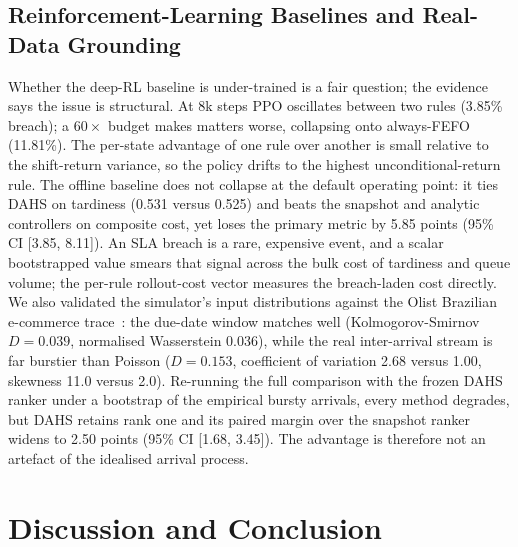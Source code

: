 \documentclass[conference]{IEEEtran}
\begin{document}
\subsection{Reinforcement-Learning Baselines and Real-Data Grounding}
\label{sec:rl}

Whether the deep-RL baseline is under-trained is a fair question; the evidence says
the issue is structural. At 8k steps PPO oscillates between two rules (3.85\%
breach); a $60\times$ budget makes matters worse, collapsing onto always-FEFO
(11.81\%). The per-state advantage of one rule over another is small relative to
the shift-return variance, so the policy drifts to the highest unconditional-return
rule. The offline baseline does not collapse at the default operating point: it
ties DAHS on tardiness (0.531 versus 0.525) and beats the snapshot and analytic
controllers on composite cost, yet loses the primary metric by 5.85 points
(95\% CI [3.85, 8.11]). An SLA breach is a rare, expensive event, and a scalar
bootstrapped value smears that signal across the bulk cost of tardiness and queue
volume; the per-rule rollout-cost vector measures the breach-laden cost directly.
We also validated the simulator's input distributions against the Olist Brazilian
e-commerce trace~\cite{olist2018dataset}: the due-date window matches well
(Kolmogorov-Smirnov $D{=}0.039$, normalised Wasserstein 0.036), while the real
inter-arrival stream is far burstier than Poisson ($D{=}0.153$, coefficient of
variation 2.68 versus 1.00, skewness 11.0 versus 2.0). Re-running
the full comparison with the frozen DAHS ranker under a bootstrap of the empirical
bursty arrivals, every method degrades, but DAHS retains rank one and its paired
margin over the snapshot ranker widens to 2.50 points (95\% CI [1.68, 3.45]). The
advantage is therefore not an artefact of the idealised arrival process.

\section{Discussion and Conclusion}
\label{sec:discussion}
\end{document}
